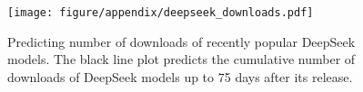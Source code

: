 \documentclass{article} %
\begin{document}
    
    \begin{figure}[ht]
        \begin{center}
            \texttt{[image: figure/appendix/deepseek\_downloads.pdf]}
        \end{center}
        \caption{Predicting number of downloads of recently popular DeepSeek models. The black line plot predicts the cumulative number of downloads of DeepSeek models up to 75 days after its release. }
        \label{fig:deepseek_downloads}

    \end{figure}
    
\end{document}
